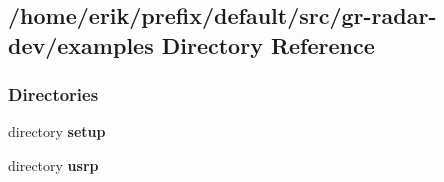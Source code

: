 \subsection{/home/erik/prefix/default/src/gr-\/radar-\/dev/examples Directory Reference}
\label{dir_1a6c0cd3ed6d658680c469bd6d5b5cc8}
\subsubsection*{Directories}
\begin{DoxyCompactItemize}
\item 
directory {\bf setup}
\item 
directory {\bf usrp}
\end{DoxyCompactItemize}
